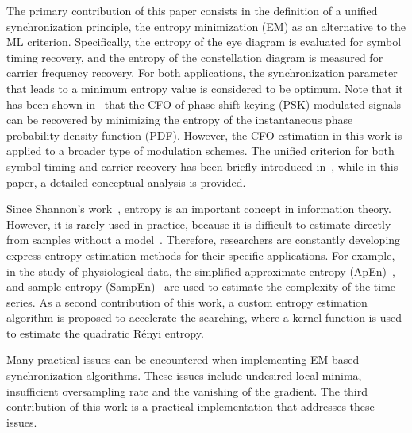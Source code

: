 \documentclass[12pt, draftclsnofoot, onecolumn]{IEEEtran}
\begin{document}
The primary contribution of this paper consists in the definition of a unified synchronization principle, the entropy minimization (EM) as an alternative to the ML criterion. 
Specifically, the entropy of the eye diagram is evaluated for symbol timing recovery, and the entropy of the constellation diagram is measured for carrier frequency recovery.
For both applications, the synchronization parameter that leads to a minimum entropy value is considered to be optimum.
Note that it has been shown in~\cite{Pedzisz2006} that the CFO of phase-shift keying (PSK) modulated signals can be recovered by minimizing the entropy of the instantaneous phase probability density function (PDF).
However, the CFO estimation in this work is applied to a broader type of modulation schemes. 
The unified criterion for both symbol timing and carrier recovery has been briefly introduced in~\cite{Liu1711:Entropy}, while in this paper, a detailed conceptual analysis is provided. 

Since Shannon's work~\cite{Shannon1948}, entropy is an important concept in information theory. 
However, it is rarely used in practice, because it is difficult to estimate directly from samples without a model~\cite{Bercher2000}.
Therefore, researchers are constantly developing express entropy estimation methods for their specific applications.
For example, in the study of physiological data, the simplified approximate entropy (ApEn)~\cite{Pincus1991}, and sample entropy (SampEn)~\cite{Richman2000} are used to estimate the complexity of the time series.
As a second contribution of this work, a custom entropy estimation algorithm is proposed to accelerate the searching,
where a kernel function is used to estimate the quadratic R\'enyi entropy.

Many practical issues can be encountered when implementing EM based synchronization algorithms.
These issues include undesired local minima, insufficient oversampling rate and the vanishing of the gradient.
The third contribution of this work is a practical implementation that addresses these issues.
\end{document}
